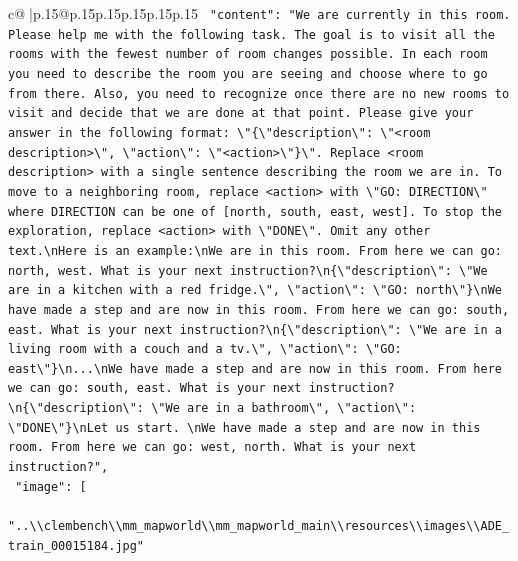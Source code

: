 \documentclass{article}
\begin{document}
{\begin{supertabular}{c@{$\;$}|p{.15\linewidth}@{}p{.15\linewidth}p{.15\linewidth}p{.15\linewidth}p{.15\linewidth}p{.15\linewidth}}
{{{\texttt{    "content": "We are currently in this room. Please help me with the following task. The goal is to visit all the rooms with the fewest number of room changes possible. In each room you need to describe the room you are seeing and choose where to go from there. Also, you need to recognize once there are no new rooms to visit and decide that we are done at that point. Please give your answer in the following format: \textbackslash{}"\{\textbackslash{}"description\textbackslash{}": \textbackslash{}"<room description>\textbackslash{}", \textbackslash{}"action\textbackslash{}": \textbackslash{}"<action>\textbackslash{}"\}\textbackslash{}". Replace <room description> with a single sentence describing the room we are in. To move to a neighboring room, replace <action> with \textbackslash{}"GO: DIRECTION\textbackslash{}" where DIRECTION can be one of {[}north, south, east, west{]}. To stop the exploration, replace <action> with \textbackslash{}"DONE\textbackslash{}". Omit any other text.\textbackslash{}nHere is an example:\textbackslash{}nWe are in this room. From here we can go: north, west. What is your next instruction?\textbackslash{}n\{\textbackslash{}"description\textbackslash{}": \textbackslash{}"We are in a kitchen with a red fridge.\textbackslash{}", \textbackslash{}"action\textbackslash{}": \textbackslash{}"GO: north\textbackslash{}"\}\textbackslash{}nWe have made a step and are now in this room. From here we can go: south, east. What is your next instruction?\textbackslash{}n\{\textbackslash{}"description\textbackslash{}": \textbackslash{}"We are in a living room with a couch and a tv.\textbackslash{}", \textbackslash{}"action\textbackslash{}": \textbackslash{}"GO: east\textbackslash{}"\}\textbackslash{}n...\textbackslash{}nWe have made a step and are now in this room. From here we can go: south, east. What is your next instruction?\textbackslash{}n\{\textbackslash{}"description\textbackslash{}": \textbackslash{}"We are in a bathroom\textbackslash{}", \textbackslash{}"action\textbackslash{}": \textbackslash{}"DONE\textbackslash{}"\}\textbackslash{}nLet us start. \textbackslash{}nWe have made a step and are now in this room. From here we can go: west, north. What is your next instruction?",} \\
\texttt{    "image": {[}} \\
\texttt{      "..\textbackslash{}\textbackslash{}clembench\textbackslash{}\textbackslash{}mm\_mapworld\textbackslash{}\textbackslash{}mm\_mapworld\_main\textbackslash{}\textbackslash{}resources\textbackslash{}\textbackslash{}images\textbackslash{}\textbackslash{}ADE\_train\_00015184.jpg"} \\
}}}
\end{supertabular}}
\end{document}

